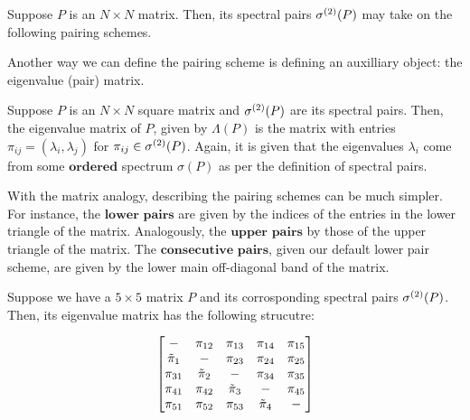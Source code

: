 
\medskip
{}
Suppose $P$ is an $N \times N$ matrix. Then, its spectral pairs ${\sigma^{(2)}}(P)$ may take on the following pairing schemes. \newline
\begin{center}
\pairingschemetable %
\end{center}
\vspace{1em}

\noindent Another way we can define the pairing scheme is defining an auxilliary object: the eigenvalue (pair) matrix.
\medskip
{}
\begin{definition}
Suppose $P$ is an $N \times N$ square matrix and ${\sigma^{(2)}}(P)$ are its spectral pairs. Then, the eigenvalue matrix of $P$, given by $\Lambda(P)$ is the matrix with entries $\pi_{ij} = (\lambda_i, \lambda_j)$ for ${\pi_{ij}} \in {\sigma^{(2)}}(P)$. Again, it is given that the eigenvalues $\lambda_i$ come from some $\textbf{ordered}$ spectrum $\sigma(P)$ as per the definition of spectral pairs.
\end{definition}

With the matrix analogy, describing the pairing schemes can be much simpler. For instance, the $\textbf{lower pairs}$ are given by the indices of the entries in the lower triangle of the matrix. Analogously, the $\textbf{upper pairs}$ by those of the upper triangle of the matrix. The $\textbf{consecutive pairs}$, given our default lower pair scheme, are given by the lower main off-diagonal band of the matrix.

\begin{example}
Suppose we have a $5 \times 5$ matrix $P$ and its corrosponding spectral pairs ${\sigma^{(2)}}(P)$. Then, its eigenvalue matrix has the following strucutre:
\end{example}
$$
\begin{bmatrix}
-      & \pi_{12} & \pi_{13}   & \pi_{14} & \pi_{15} \\
{\tilde{\pi}}_{1} & -      & \pi_{23}   & \pi_{24} & \pi_{25} \\
\pi_{31} & {\tilde{\pi}}_{2} & -        & \pi_{34} & \pi_{35} \\
\pi_{41} & \pi_{42} & {\tilde{\pi}}_{3} & -        & \pi_{45} \\
\pi_{51} & \pi_{52} & \pi_{53} & {\tilde{\pi}}_{4} & -        \\
\end{bmatrix}
$$
\newline

